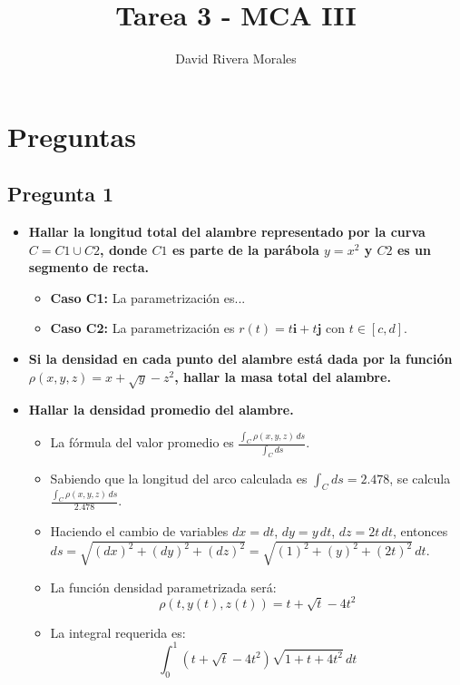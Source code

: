 \documentclass{article}
\title{Tarea 3 - MCA III}
\author{David Rivera Morales}
\date{}
\begin{document}
\maketitle

\section*{Preguntas}

\subsection*{Pregunta 1}
\begin{itemize}
    \item \textbf{Hallar la longitud total del alambre representado por la curva \( C = C1 \cup C2 \), donde \( C1 \) es parte de la parábola \( y = x^2 \) y \( C2 \) es un segmento de recta.}
    \begin{itemize}
        \item \textbf{Caso C1:} La parametrización es...
        \item \textbf{Caso C2:} La parametrización es \( r(t) = t\mathbf{i} + t\mathbf{j} \) con \( t \in [c, d] \).
    \end{itemize}

    \item \textbf{Si la densidad en cada punto del alambre está dada por la función \( \rho(x, y, z) = x + \sqrt{y} - z^2 \), hallar la masa total del alambre.}
    
    \item \textbf{Hallar la densidad promedio del alambre.}
    \begin{itemize}
        \item La fórmula del valor promedio es \( \frac{\int_{C} \rho(x, y, z) \, ds}{\int_{C} ds} \).
        \item Sabiendo que la longitud del arco calculada es \( \int_{C} ds = 2.478 \), se calcula \( \frac{\int_{C} \rho(x, y, z) \, ds}{2.478} \).
        \item Haciendo el cambio de variables \( dx = dt \), \( dy = y \, dt \), \( dz = 2t \, dt \), entonces \( ds = \sqrt{(dx)^2 + (dy)^2 + (dz)^2} = \sqrt{(1)^2 + (y)^2 + (2t)^2} \, dt \).
        \item La función densidad parametrizada será:
        \[ \rho(t, y(t), z(t)) = t + \sqrt{t} - 4t^2 \]
        \item La integral requerida es:
        \[ \int_{0}^{1} \left( t + \sqrt{t} - 4t^2 \right) \sqrt{1 + t + 4t^2} \, dt \]
    \end{itemize}
\end{itemize}
\end{document}
